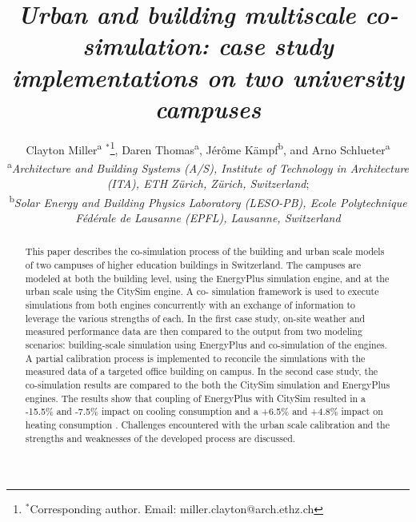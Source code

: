 \documentclass{tBPS2e}
\theoremstyle{plain}
\theoremstyle{definition}
\theoremstyle{remark}
\newcommand{\noteDT}[1]{\footnote{\textcolor{green}{#1}}}
\providecommand{\DIFadd}[1]{{\protect\color{blue}\uwave{#1}}} %
\providecommand{\DIFaddbegin}{} %
\providecommand{\DIFaddend}{} %
\begin{document}


\title{\textit{Urban and building multiscale co-simulation: case study implementations on two university campuses}}

\author{Clayton Miller\textsuperscript{a}%
$^{\ast}$\thanks{$^\ast$Corresponding author. Email: miller.clayton@arch.ethz.ch}, 
Daren Thomas\textsuperscript{a},
J\'er\^ome K\"ampf\textsuperscript{b},
and Arno Schlueter\textsuperscript{a}\\
\vspace{6pt}
\textsuperscript{a}{\em Architecture and Building Systems (A/S), Institute of Technology in Architecture (ITA), ETH Z\"urich, Z\"urich, Switzerland};\\
\textsuperscript{b}{\em Solar Energy and Building Physics Laboratory (LESO-PB), Ecole Polytechnique F\'ed\'erale de Lausanne (EPFL), Lausanne, Switzerland}
}

\maketitle

\begin{abstract}
    This paper describes the co-simulation process of the building and urban
    scale models of two campuses of higher education buildings in Switzerland.
    The campuses are modeled at both the building level, using the EnergyPlus
    simulation engine, and at the urban scale using the CitySim engine. A co-
    simulation framework is used to execute simulations from both engines
    concurrently with an exchange of information to leverage the various
    strengths of each. In the first case study, on-site weather and measured
    performance data are then compared to the output from two modeling
    scenarios: building-scale simulation using EnergyPlus and co-simulation of
    the engines. A partial calibration process is implemented to reconcile the
    simulations with the measured data of a targeted office building on
    campus. In the second case study, the co-simulation results are compared
    to the both the CitySim simulation and EnergyPlus engines. The results
    show that coupling of EnergyPlus with CitySim resulted in a -15.5\% and
    -7.5\% impact on cooling consumption and a +6.5\% and +4.8\% impact on
    heating consumption \DIFaddbegin \DIFadd{as compared to solo simulations}\DIFaddend . Challenges encountered with the urban scale
    calibration and the strengths and weaknesses of the developed process are
    discussed.
\end{abstract}
\end{document}
